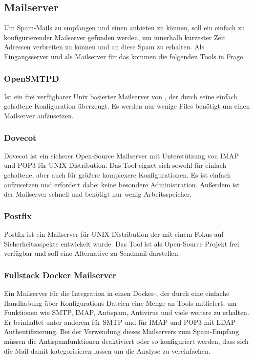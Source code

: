 \documentclass[a4paper,11pt,singlespacing]{article}
\begin{document}
	\subsection{Mailserver}\label{sec:Mailserver}
		Um Spam-Mails zu empfangen und einen  anbieten zu können, soll ein einfach zu konfigurierender Mailserver gefunden werden, um innerhalb kürzester Zeit Adressen verbreiten zu können und an diese Spam zu erhalten.
		Als Eingangsserver und als Mailserver für das  kommen die folgenden Tools in Frage. 
		\subsubsection{OpenSMTPD}\label{sec:OpenSMTPD}
			Ist ein frei verfügbarer Unix basierter Mailserver von , der durch seine einfach gehaltene Konfiguration überzeugt. Es werden nur wenige Files benötigt um einen Mailserver aufzusetzen.
		\subsubsection{Dovecot}\label{sec:Dovecot}
		Dovecot ist ein sicherer Open-Source Mailserver mit Unterstützung von IMAP und POP3 für UNIX Distribution. Das Tool eignet sich sowohl für einfach gehaltene, aber auch für größere komplexere Konfigurationen. Es ist einfach aufzusetzen und erfordert dabei keine besondere Administration. Außerdem ist der Mailserver schnell und benötigt nur wenig Arbeitsspeicher. \cite{dovecot}
		\subsubsection{Postfix}\label{sec:Postfix}
			Postfix ist ein Mailserver für UNIX Distribution der mit einem Fokus auf Sicherheitsaspekte entwickelt wurde. Das Tool ist als Open-Source Projekt frei verfügbar und soll eine Alternative zu Sendmail darstellen. \cite{postfix}
		\subsubsection{Fullstack Docker Mailserver}\label{sec:FullstackDockerMailserver}
			Ein Mailserver für die Integration in einen Docker-, der durch eine einfache Handhabung über Konfigurations-Dateien eine Menge an Tools mitliefert, um Funktionen wie SMTP, IMAP, Antispam, Antivirus und viele weitere zu erhalten. Er beinhaltet unter anderem  für SMTP und  für IMAP und  POP3 mit LDAP Authentifizierung. \cite{fullstackDockerMailserver} Bei der Verwendung dieses Mailservers zum Spam-Empfang müssen die Antispamfunktionen deaktiviert oder so konfiguriert werden, dass sich die Mail damit kategorisieren lassen um die Analyse zu vereinfachen.
\end{document}
